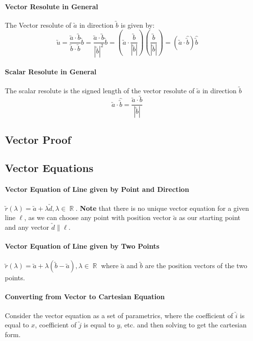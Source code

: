 \documentclass[a4paper,twoside]{article}
\DeclareMathOperator\R{\mathbb{R}}
\begin{document}
			\paragraph{Vector Resolute in General}
			The Vector resolute of $\utilde{a}$ in direction $\utilde{b}$ is given by:
			\[
				\utilde{u}=\frac{\utilde{a}\cdot\utilde{b}}{\utilde{b}\cdot\utilde{b}}\utilde{b}=\frac{\utilde{a}\cdot\utilde{b}}{|\utilde{b}|^2}\utilde{b}=\left(\utilde{a}\cdot\frac{\utilde{b}}{|\utilde{b}|}\right)\left(\frac{\utilde{b}}{|\utilde{b}|}\right)=\left(\utilde{a}\cdot\hat{\utilde{b}}\right)\hat{\utilde{b}}
			\]
			\paragraph{Scalar Resolute in General} The scalar resolute is the signed length of the vector resolute of $\utilde{a}$ in direction $\utilde{b}$
			\[
				\utilde{a}\cdot\hat{\utilde{b}}=\frac{\utilde{a}\cdot\utilde{b}}{|\utilde{b}|}
			\]
		\subsection{Vector Proof}
		\subsection{Vector Equations}
			\paragraph{Vector Equation of Line given by Point and Direction} $\utilde{r}(\lambda)=\utilde{a}+\lambda\utilde{d},\lambda\in\R$. \textbf{Note} that there is no unique vector equation for a given line $\ell$, as we can choose any point with position vector $\utilde{a}$ as our starting point and any vector $\utilde{d}\parallel \ell$.
			
			\paragraph{Vector Equation of Line given by Two Points} $\utilde{r}(\lambda)=\utilde{a}+\lambda\left(\utilde{b}-\utilde{a}\right),\lambda\in\R$ where $\utilde{a}$ and $\utilde{b}$ are the position vectors of the two points.
			
			\paragraph{Converting from Vector to Cartesian Equation} Consider the vector equation as a set of parametrics, where the coefficient of $\utilde{i}$ is equal to $x$, coefficient of $\utilde{j}$ is equal to $y$, etc. and then solving to get the cartesian form.
			
\end{document}
